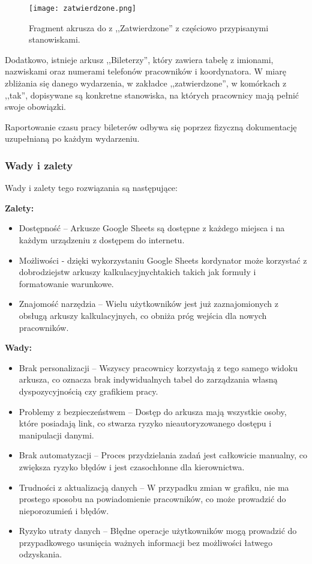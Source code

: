 \documentclass[shortabstract]{iithesis}
\begin{document}
\begin{figure}[h] %
\centering %
\texttt{[image: zatwierdzone.png]} %
\caption{Fragment akrusza do z ,,Zatwierdzone'' z częściowo przypisanymi stanowiskami.} %
\label{fig:dyspo} %
\end{figure}

Dodatkowo, istnieje arkusz ,,Bileterzy'', który zawiera tabelę z imionami, nazwiskami oraz numerami telefonów pracowników i koordynatora. W miarę zbliżania się danego wydarzenia, w zakładce ,,zatwierdzone'', w komórkach z ,,tak'', dopisywane są konkretne stanowiska, na których pracownicy mają pełnić swoje obowiązki.

Raportowanie czasu pracy bileterów odbywa się poprzez fizyczną dokumentację uzupełnianą po każdym wydarzeniu.

\subsubsection{Wady i zalety}
Wady i zalety tego rozwiązania są następujące:

\textbf{Zalety:}
\begin{itemize}
  \item Dostępność – Arkusze Google Sheets są dostępne z każdego miejsca i na każdym urządzeniu z dostępem do internetu.
  \item Możliwości - dzięki wykorzystaniu Google Sheets kordynator może korzystać z dobrodziejstw arkuszy kalkulacyjnychtakich takich jak formuły i formatowanie warunkowe.
  \item Znajomość narzędzia – Wielu użytkowników jest już zaznajomionych z obsługą arkuszy kalkulacyjnych, co obniża próg wejścia dla nowych pracowników.
\end{itemize}

\textbf{Wady:}
\begin{itemize}
  \item Brak personalizacji – Wszyscy pracownicy korzystają z tego samego widoku arkusza, co oznacza brak indywidualnych tabel do zarządzania własną dyspozycyjnością czy grafikiem pracy.
  \item Problemy z bezpieczeństwem – Dostęp do arkusza mają wszystkie osoby, które posiadają link, co stwarza ryzyko nieautoryzowanego dostępu i manipulacji danymi.
  \item Brak automatyzacji – Proces przydzielania zadań jest całkowicie manualny, co zwiększa ryzyko błędów i jest czasochłonne dla kierownictwa.
  \item Trudności z aktualizacją danych – W przypadku zmian w grafiku, nie ma prostego sposobu na powiadomienie pracowników, co może prowadzić do nieporozumień i błędów.
  \item Ryzyko utraty danych – Błędne operacje użytkowników mogą prowadzić do przypadkowego usunięcia ważnych informacji bez możliwości łatwego odzyskania.
\end{itemize}
\end{document}
